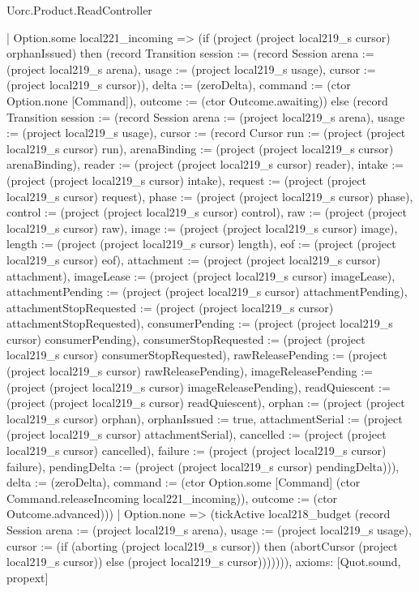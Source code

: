 \begin{lexlean}{Uorc.Product.ReadController}
\begin{semanticmodule}
{    | Option.some local221_incoming => (if (project (project local219_s cursor) orphanIssued) then (record Transition {session := (record Session {arena := (project local219_s arena), usage := (project local219_s usage), cursor := (project local219_s cursor)}), delta := (zeroDelta), command := (ctor Option.none [Command]), outcome := (ctor Outcome.awaiting)}) else (record Transition {session := (record Session {arena := (project local219_s arena), usage := (project local219_s usage), cursor := (record Cursor {run := (project (project local219_s cursor) run), arenaBinding := (project (project local219_s cursor) arenaBinding), reader := (project (project local219_s cursor) reader), intake := (project (project local219_s cursor) intake), request := (project (project local219_s cursor) request), phase := (project (project local219_s cursor) phase), control := (project (project local219_s cursor) control), raw := (project (project local219_s cursor) raw), image := (project (project local219_s cursor) image), length := (project (project local219_s cursor) length), eof := (project (project local219_s cursor) eof), attachment := (project (project local219_s cursor) attachment), imageLease := (project (project local219_s cursor) imageLease), attachmentPending := (project (project local219_s cursor) attachmentPending), attachmentStopRequested := (project (project local219_s cursor) attachmentStopRequested), consumerPending := (project (project local219_s cursor) consumerPending), consumerStopRequested := (project (project local219_s cursor) consumerStopRequested), rawReleasePending := (project (project local219_s cursor) rawReleasePending), imageReleasePending := (project (project local219_s cursor) imageReleasePending), readQuiescent := (project (project local219_s cursor) readQuiescent), orphan := (project (project local219_s cursor) orphan), orphanIssued := true, attachmentSerial := (project (project local219_s cursor) attachmentSerial), cancelled := (project (project local219_s cursor) cancelled), failure := (project (project local219_s cursor) failure), pendingDelta := (project (project local219_s cursor) pendingDelta)})}), delta := (zeroDelta), command := (ctor Option.some [Command] (ctor Command.releaseIncoming local221_incoming)), outcome := (ctor Outcome.advanced)}))
    | Option.none => (tickActive local218_budget (record Session {arena := (project local219_s arena), usage := (project local219_s usage), cursor := (if (aborting (project local219_s cursor)) then (abortCursor (project local219_s cursor)) else (project local219_s cursor))}))))),
  axioms: [Quot.sound, propext]
}


\end{semanticmodule}
\end{lexlean}

